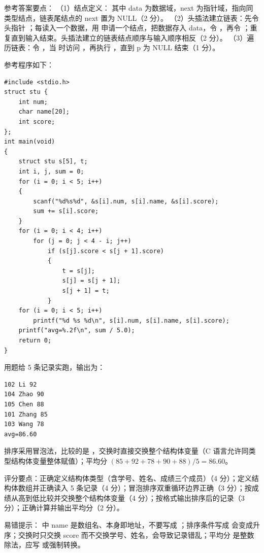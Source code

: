 \documentclass[a4paper,11pt]{article}
\begin{document}
\q 参考答案要点：
（1）结点定义： 其中 data 为数据域，next 为指针域，指向同类型结点，链表尾结点的 next 置为 NULL（2 分）。
（2）头插法建立链表：先令头指针 ；每读入一个数据，用  申请一个结点，把数据存入 data，令 ，再令 ；重复直到输入结束。头插法建立的链表结点顺序与输入顺序相反（2 分）。
（3）遍历链表：令 ，当  时访问 ，再执行 ，直到 p 为 NULL 结束（1 分）。


\q 参考程序如下：
\begin{lstlisting}[language={[custom]C}]
#include <stdio.h>
struct stu {
    int num;
    char name[20];
    int score;
};
int main(void)
{
    struct stu s[5], t;
    int i, j, sum = 0;
    for (i = 0; i < 5; i++)
    {
        scanf("%d%s%d", &s[i].num, s[i].name, &s[i].score);
        sum += s[i].score;
    }
    for (i = 0; i < 4; i++)
        for (j = 0; j < 4 - i; j++)
            if (s[j].score < s[j + 1].score)
            {
                t = s[j];
                s[j] = s[j + 1];
                s[j + 1] = t;
            }
    for (i = 0; i < 5; i++)
        printf("%d %s %d\n", s[i].num, s[i].name, s[i].score);
    printf("avg=%.2f\n", sum / 5.0);
    return 0;
}
\end{lstlisting}
\begin{analysis}用题给 5 条记录实跑，输出为：
\begin{lstlisting}
102 Li 92
104 Zhao 90
105 Chen 88
101 Zhang 85
103 Wang 78
avg=86.60
\end{lstlisting}
排序采用冒泡法，比较的是 ，交换时直接交换整个结构体变量（C 语言允许同类型结构体变量整体赋值）；平均分 $(85+92+78+90+88)/5=86.60$。\end{analysis}
\begin{analysis}评分要点：正确定义结构体类型（含学号、姓名、成绩三个成员）（4 分）；定义结构体数组并正确读入 5 条记录（4 分）；冒泡排序双重循环边界正确（3 分）；按成绩从高到低比较并交换整个结构体变量（4 分）；按格式输出排序后的记录（3 分）；正确计算并输出平均分（2 分）。\end{analysis}
\begin{analysis}易错提示： 中 name 是数组名、本身即地址，不要写成 ；排序条件写成 \code{>} 会变成升序；交换时只交换 score 而不交换学号、姓名，会导致记录错乱；平均分  是整数除法，应写  或强制转换。\end{analysis}
\end{document}
